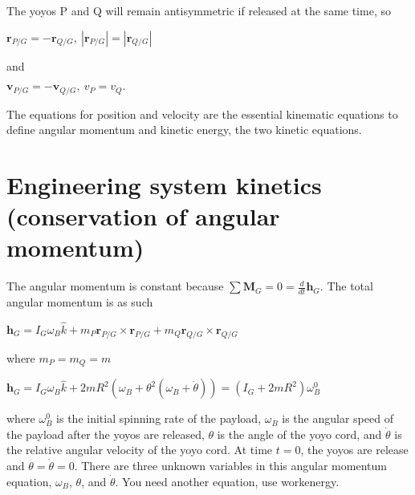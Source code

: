 \documentclass[letterpaper,10pt,english]{sphinxmanual}
\begin{document}
\begin{sphinxVerbatim}[commandchars=\\\{\}]
  
  
  
  
  
\end{sphinxVerbatim}

The yoyos P and Q will remain anti\sphinxhyphen{}symmetric if released at the same time, so

\(\mathbf{r}_{P/G} = -\mathbf{r}_{Q/G},~|\mathbf{r}_{P/G}| =
|\mathbf{r}_{Q/G}|\)

and

\(\mathbf{v}_{P/G} = -\mathbf{v}_{Q/G},~v_P = v_Q.\)

The equations for position and velocity are the essential kinematic
equations to define angular momentum and kinetic energy, the two kinetic
equations.


\section{Engineering system \sphinxhyphen{} kinetics (conservation of angular momentum)}
\label{\detokenize{module_04/yoyo-despin_02:engineering-system-kinetics-conservation-of-angular-momentum}}
The angular momentum is constant because \(\sum \mathbf{M}_G = 0 =
\frac{d}{dt}\mathbf{h}_G\). The total angular momentum is as such

\(\mathbf{h}_G = I_G \omega_B \hat{k} + m_P \mathbf{r}_{P/G} \times
\mathbf{r}_{P/G}+
 m_Q \mathbf{r}_{Q/G} \times \mathbf{r}_{Q/G}\)

where \(m_P = m_Q = m\)

\(\mathbf{h}_G = I_G \omega_B \hat{k} + 2mR^2(\omega_B +
\theta^2(\omega_B+\dot{\theta})) = (I_G + 2mR^2)\omega_B^0\)

where \(\omega_B^0\) is the initial spinning rate of the payload,
\(\omega_B\) is the angular speed of the payload after the yoyos are
released, \(\theta\) is the angle of the yoyo cord, and \(\dot{\theta}\) is
the relative angular velocity of the yoyo cord. At time \(t=0\), the yoyos
are release and \(\theta = \dot{\theta}=0\). There are three unknown
variables in this angular momentum equation, \(\omega_B\), \(\theta\), and
\(\dot{\theta}\). You need another equation, use work\sphinxhyphen{}energy.
\end{document}
